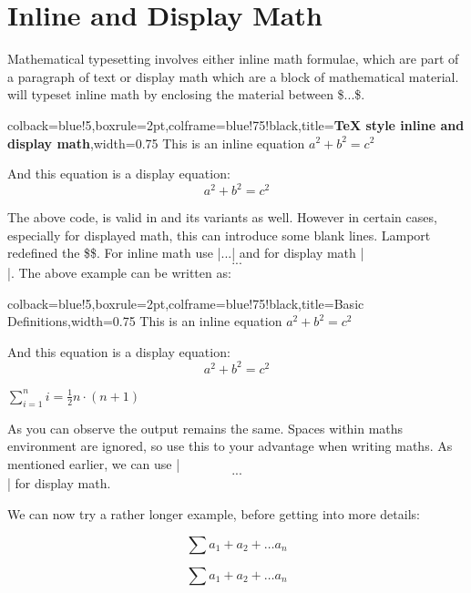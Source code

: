 \pagestyle{headings}

\section{Inline and Display Math}
Mathematical typesetting involves either inline math formulae, which are part of a paragraph of text or display math which are a block of mathematical material. \tex will typeset inline math by enclosing the material between 
\$...\$. 
\bigskip

\begin{tcblisting}{colback=blue!5,boxrule=2pt,colframe=blue!75!black,title=\textbf{TeX style inline and display math},width=0.75\textwidth}
This is an inline equation $a^2+b^2=c^2$

And this equation is a display equation:
$$a^2+b^2=c^2$$
\end{tcblisting}
\bigskip

The above code, is valid in \latex and its variants as well. However in certain cases, especially for displayed math, this can introduce some blank lines. Lamport redefined
the \$\$. For inline math use |\(...\)| and for display math |\[...\] |. The above example can be written as:
\bigskip

\begin{tcblisting}{colback=blue!5,boxrule=2pt,colframe=blue!75!black,title=Basic Definitions,width=0.75\textwidth}
This is an inline equation \(a^2+b^2=c^2\)

And this equation is a display equation:
\[a^2+b^2=c^2\]

\begin{math}
\sum_{i=1}^{n}i=\frac{1}{2}n\cdot(n+1)
\end{math}
\end{tcblisting}
\bigskip


As you can observe the output remains the same.  Spaces within  maths environment are ignored, so use this to your advantage when writing maths. As mentioned earlier, we can use |\[...\]| for display math.

We can now try a rather longer example, before getting into more details:
\begin{shaded}
\begin{teXXX}
\[ \sum a_1+a_2+\dots a_n \]
\end{teXXX}
\[ \sum a_1+a_2+\dots a_n \]
\end{shaded}

